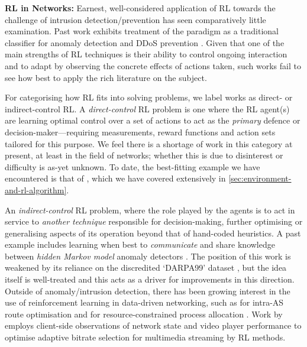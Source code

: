 \documentclass[conference, letterpaper, 10pt, times]{IEEEtran}
\newcommand{\fakepara}[1]{\noindent\textbf{#1:}}
\begin{document}
\fakepara{RL in Networks}
Earnest, well-considered application of RL towards the challenge of intrusion detection/prevention has seen comparatively little examination.
Past work exhibits treatment of the paradigm as a traditional classifier for anomaly detection \cite{shamshirband2014anomaly} and DDoS prevention \cite{DBLP:conf/mates/ServinK08}.
Given that one of the main strengths of RL techniques is their ability to control ongoing interaction and to adapt by observing the concrete effects of actions taken, such works fail to see how best to apply the rich literature on the subject.

For categorising how RL fits into solving problems, we label works as direct- or indirect-control RL.
A \emph{direct-control} RL problem is one where the RL agent(s) are learning optimal control over a set of actions to act as the \emph{primary} defence or decision-maker---requiring measurements, reward functions and action sets tailored for this purpose.
We feel there is a shortage of work in this category at present, at least in the field of networks; whether this is due to disinterest or difficulty is as-yet unknown.
To date, the best-fitting example we have encountered is that of \textcite{DBLP:journals/eaai/MalialisK15}, which we have covered extensively in \cref{sec:environment-and-rl-algorithm}.

An \emph{indirect-control} RL problem, where the role played by the agents is to act in service to \emph{another technique} responsible for decision-making, further optimising or generalising aspects of its operation beyond that of hand-coded heuristics.
A past example includes learning when best to \emph{communicate} and share knowledge between \emph{hidden Markov model} anomaly detectors \cite{DBLP:conf/paisi/XuSH07}.
The position of this work is weakened by its reliance on the discredited `DARPA99' dataset \cite{DARPA-IDD, DBLP:conf/cisda/TavallaeeBLG09, DBLP:conf/sp/SommerP10}, but the idea itself is well-treated and this acts as a driver for improvements in this direction.
Outside of anomaly/intrusion detection, there has been growing interest in the use of reinforcement learning in data-driven networking, such as for intra-AS route optimisation \cite{DBLP:conf/hotnets/ValadarskySST17} and for resource-constrained process allocation \cite{DBLP:conf/hotnets/MaoAMK16}.
Work by \textcite{DBLP:conf/sigcomm/MaoNA17} employs client-side observations of network state and video player performance to optimise adaptive bitrate selection for multimedia streaming by RL methods.
\end{document}
